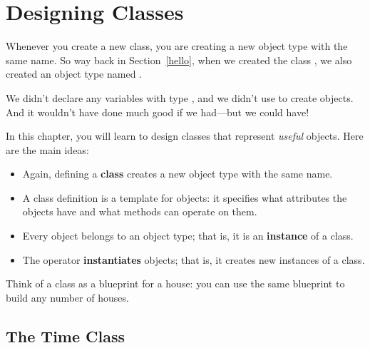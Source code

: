 \chapter{Designing Classes}


Whenever you create a new class, you are creating a new object type with the same name.
So way back in Section~\ref{hello}, when we created the class , we also created an object type named .

We didn't declare any variables with type , and we didn't use  to create  objects.
And it wouldn't have done much good if we had---but we could have!

In this chapter, you will learn to design classes that represent {\em useful} objects.  Here are the main ideas:

\begin{itemize}

\item Again, defining a {\bf class} creates a new object type with the same name.


\item A class definition is a template for objects: it specifies what attributes the objects have and what methods can operate on them.


\item Every object belongs to an object type; that is, it is an {\bf instance} of a class.


\item The  operator {\bf instantiates} objects; that is, it creates new instances of a class.



\end{itemize}

Think of a class as a blueprint for a house: you can use the same blueprint to build any number of houses.

\section{The Time Class}


